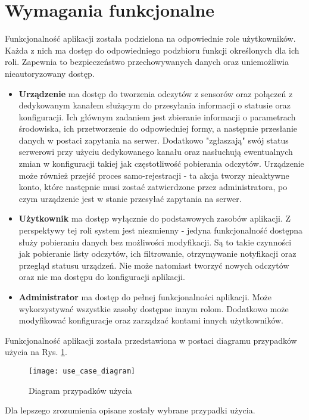 \section{Wymagania funkcjonalne}
Funkcjonalność aplikacji została podzielona na odpowiednie role użytkowników. 
Każda z nich ma dostęp do odpowiedniego podzbioru funkcji określonych dla ich roli.
Zapewnia to bezpieczeństwo przechowywanych danych oraz uniemożliwia nieautoryzowany dostęp.
\begin{itemize}
  \item \textbf{Urządzenie} ma dostęp do tworzenia odczytów z sensorów oraz połączeń z dedykowanym
    kanałem służącym do przesyłania informacji o statusie oraz konfiguracji. Ich głównym zadaniem
    jest zbieranie informacji o parametrach środowiska, ich przetworzenie do odpowiedniej
    formy, a następnie przesłanie danych w postaci zapytania na serwer. Dodatkowo "zgłaszają"
    swój status serwerowi przy użyciu dedykowanego kanału oraz nasłuchują ewentualnych zmian
    w konfiguracji takiej jak częstotliwość pobierania odczytów. Urządzenie może również
    przejść proces samo-rejestracji - ta akcja tworzy nieaktywne konto, które następnie
    musi zostać zatwierdzone przez administratora, po czym urządzenie jest w stanie
    przesyłać zapytania na serwer.
  \item \textbf{Użytkownik} ma dostęp wyłącznie do podstawowych zasobów aplikacji. Z perspektywy
    tej roli system jest niezmienny - jedyna funkcjonalność dostępna służy pobieraniu danych
    bez możliwości modyfikacji. Są to takie czynności jak pobieranie listy odczytów, ich filtrowanie,
    otrzymywanie notyfikacji oraz przegląd statusu urządzeń. Nie może natomiast tworzyć nowych
    odczytów oraz nie ma dostępu do konfiguracji aplikacji.
  \item \textbf{Administrator} ma dostęp do pełnej funkcjonalności aplikacji. Może wykorzystywać
    wszystkie zasoby dostępne innym rolom. Dodatkowo może modyfikować konfiguracje oraz zarządzać kontami
    innych użytkowników.
\end{itemize}

Funkcjonalność aplikacji została przedstawiona w postaci diagramu przypadków użycia na Rys. \ref{uml:use_case}.
\begin{figure}[h!]
  \centering
  \texttt{[image: use\_case\_diagram]}
  \caption{Diagram przypadków użycia}
  \label{uml:use_case}
\end{figure}
Dla lepszego zrozumienia opisane zostały wybrane przypadki użycia.

